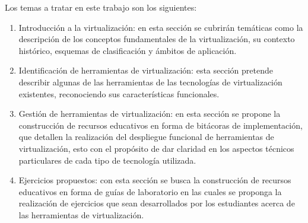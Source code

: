 Los temas a tratar en este trabajo son los siguientes: \\


\begin{enumerate}
	\item Introducción a la virtualización: en esta sección se cubrirán temáticas como la descripción de los conceptos fundamentales de la virtualización, su contexto histórico, esquemas de clasificación y ámbitos de aplicación.\\
	
	\item Identificación de herramientas de virtualización: esta sección pretende describir algunas de las herramientas de las tecnologías de virtualización existentes, reconociendo sus características funcionales. \\
	
	\item Gestión de herramientas de virtualización: en esta sección se propone la construcción de recursos educativos en forma de bitácoras de implementación, que detallen la realización del despliegue funcional de herramientas de virtualización, esto con el propósito de dar claridad en los aspectos técnicos particulares de cada tipo de tecnología utilizada. \\
	
	\item Ejercicios propuestos: con esta sección se busca la construcción de recursos educativos en forma de guías de laboratorio en las cuales se proponga la realización de ejercicios que sean desarrollados por los estudiantes acerca de las herramientas de virtualización.\\
	
\end{enumerate}
